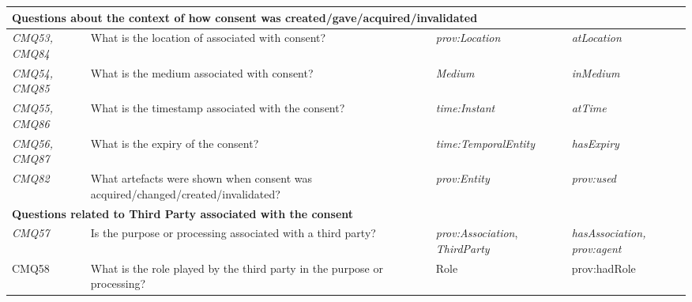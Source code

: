 \begin{table}[htbp]
\begin{tabularx}{\textwidth}{|p{1cm}|X|p{4cm}|p{3.5cm}|}
\multicolumn{4}{|l|}{\textbf{Questions about the context of how consent was created/gave/acquired/invalidated}} \\ \hline
\textit{CMQ53, CMQ84} & What is the location of associated with consent? & \textit{prov:Location} & \textit{atLocation} \\ \hline
\textit{CMQ54, CMQ85} & What is the medium associated with consent? & \textit{Medium} & \textit{inMedium} \\ \hline
\textit{CMQ55, CMQ86} & What is the timestamp associated with the consent? & \textit{time:Instant} & \textit{atTime} \\ \hline
\textit{CMQ56, CMQ87} & What is the expiry of the consent? & \textit{time:TemporalEntity} & \textit{hasExpiry} \\ \hline
\textit{CMQ82} & What artefacts were shown when consent was acquired/changed/created/invalidated? & \textit{prov:Entity} & \textit{prov:used} \\ \hline
\multicolumn{4}{|l|}{\textbf{Questions related to Third Party associated with the consent}} \\ \hline
\textit{CMQ57} & Is the purpose or processing associated with a third party? & \textit{prov:Association}, \textit{ThirdParty} & \textit{hasAssociation, prov:agent} \\ \hline
CMQ58 & What is the role played by the third party in the purpose or processing? & Role & prov:hadRole \\ \hline
\end{tabularx}
\label{table:gconsent:cq}
\end{table}

